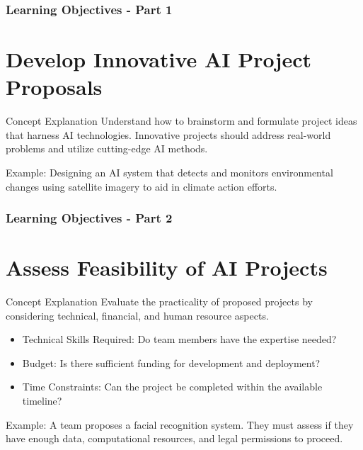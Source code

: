 \documentclass[aspectratio=169]{beamer}
\begin{document}
\begin{frame}[fragile]
    \frametitle{Learning Objectives - Part 1}
    \section{Develop Innovative AI Project Proposals}
    \begin{block}{Concept Explanation}
        Understand how to brainstorm and formulate project ideas that harness AI technologies. Innovative projects should address real-world problems and utilize cutting-edge AI methods.
    \end{block}
    \begin{example}
        Example: Designing an AI system that detects and monitors environmental changes using satellite imagery to aid in climate action efforts.
    \end{example}
\end{frame}

\begin{frame}[fragile]
    \frametitle{Learning Objectives - Part 2}
    \section{Assess Feasibility of AI Projects}
    \begin{block}{Concept Explanation}
        Evaluate the practicality of proposed projects by considering technical, financial, and human resource aspects.
    \end{block}
    \begin{itemize}
        \item Technical Skills Required: Do team members have the expertise needed?
        \item Budget: Is there sufficient funding for development and deployment?
        \item Time Constraints: Can the project be completed within the available timeline?
    \end{itemize}
    \begin{example}
        Example: A team proposes a facial recognition system. They must assess if they have enough data, computational resources, and legal permissions to proceed.
    \end{example}
\end{frame}
\end{document}
